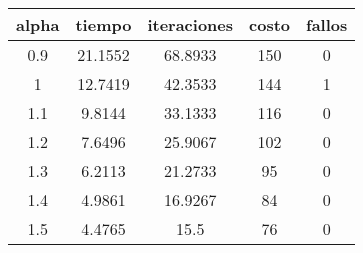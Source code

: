 \begin{table}[h!]
\centering
\begin{tabular}{ccccc}
alpha & tiempo & iteraciones & costo & fallos \\ 
\hline 
0.9 & 21.1552 & 68.8933 & 150 & 0 \\ 
1 & 12.7419 & 42.3533 & 144 & 1 \\ 
1.1 & 9.8144 & 33.1333 & 116 & 0 \\ 
1.2 & 7.6496 & 25.9067 & 102 & 0 \\ 
1.3 & 6.2113 & 21.2733 & 95 & 0 \\ 
1.4 & 4.9861 & 16.9267 & 84 & 0 \\ 
1.5 & 4.4765 & 15.5 & 76 & 0 \\ 
\hline 
\end{tabular}
\end{table}